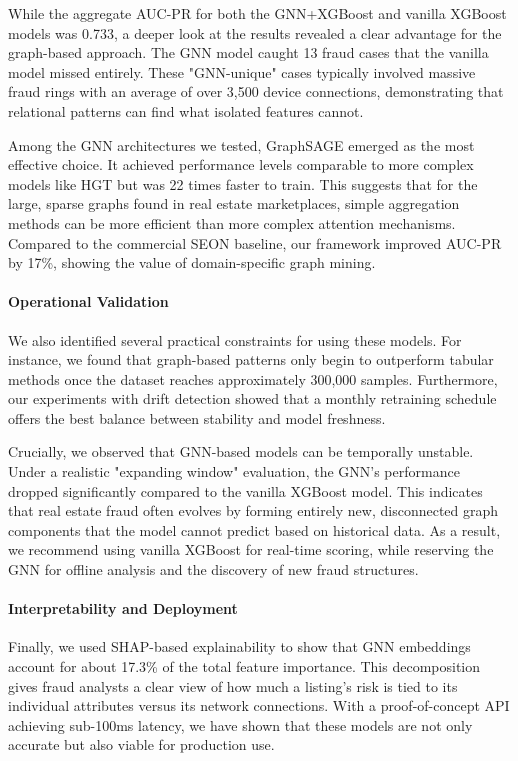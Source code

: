 While the aggregate AUC-PR for both the GNN+XGBoost and vanilla XGBoost models was 0.733, a deeper look at the results revealed a clear advantage for the graph-based approach. The GNN model caught 13 fraud cases that the vanilla model missed entirely. These "GNN-unique" cases typically involved massive fraud rings with an average of over 3,500 device connections, demonstrating that relational patterns can find what isolated features cannot.

Among the GNN architectures we tested, GraphSAGE emerged as the most effective choice. It achieved performance levels comparable to more complex models like HGT but was 22 times faster to train. This suggests that for the large, sparse graphs found in real estate marketplaces, simple aggregation methods can be more efficient than more complex attention mechanisms. Compared to the commercial SEON baseline, our framework improved AUC-PR by 17\%, showing the value of domain-specific graph mining.

\paragraph{Operational Validation}
We also identified several practical constraints for using these models. For instance, we found that graph-based patterns only begin to outperform tabular methods once the dataset reaches approximately 300,000 samples. Furthermore, our experiments with drift detection showed that a monthly retraining schedule offers the best balance between stability and model freshness.

Crucially, we observed that GNN-based models can be temporally unstable. Under a realistic "expanding window" evaluation, the GNN's performance dropped significantly compared to the vanilla XGBoost model. This indicates that real estate fraud often evolves by forming entirely new, disconnected graph components that the model cannot predict based on historical data. As a result, we recommend using vanilla XGBoost for real-time scoring, while reserving the GNN for offline analysis and the discovery of new fraud structures.

\paragraph{Interpretability and Deployment}
Finally, we used SHAP-based explainability to show that GNN embeddings account for about 17.3\% of the total feature importance. This decomposition gives fraud analysts a clear view of how much a listing's risk is tied to its individual attributes versus its network connections. With a proof-of-concept API achieving sub-100ms latency, we have shown that these models are not only accurate but also viable for production use.
